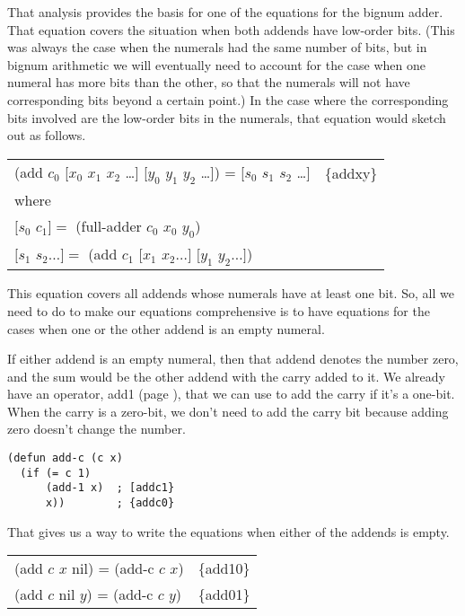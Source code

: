 That analysis provides the basis for
one of the equations for the bignum adder.
That equation covers the situation when both addends have
low-order bits. (This was always the case when
the numerals had the same number of bits, but in bignum
arithmetic we will eventually need to account for the
case when one numeral has more bits than the other,
so that the numerals will not have corresponding bits 
beyond a certain point.)
In the case where the corresponding bits involved
are the low-order bits in the numerals,
that equation would sketch out as follows.

\begin{center}
\begin{tabular}{ll}
(add $c_0$ [$x_0$ $x_1$ $x_2$ \dots ] [$y_0$ $y_1$ $y_2$ \dots ]) = [$s_0$ $s_1$ $s_2$ \dots ]   & \{addxy\} \\
where & \\
$[s_0$ $c_1] =$ (full-adder $c_0$ $x_0$ $y_0$) & \\
$[s_1$ $s_2 \dots ] =$ (add $c_1$ $[x_1$ $x_2 \dots ]$ $[y_1$ $y_2 \dots ]$) & \\
\end{tabular}
\end{center}

This equation covers all addends whose numerals have at least one bit.
So, all we need to do to make our equations comprehensive
is to have equations for the cases when one or the other addend is an empty numeral.

If either addend is an empty numeral, then that addend denotes the number zero,
and the sum would be the other addend with the carry added to it.
We already have an operator, add1 (page \pageref{add-1-defun}), 
that we can use to add the carry if it's a one-bit.
When the carry is a zero-bit, we don't need to add the carry bit
because adding zero doesn't change the number.

\label{add-c-defun}
\begin{Verbatim}
(defun add-c (c x)
  (if (= c 1)
      (add-1 x)  ; [addc1}
      x))        ; {addc0}
\end{Verbatim}

That gives us a way to write the equations when either of the addends is empty.
\begin{center}
\begin{tabular}{ll}
(add $c$ $x$ nil) = (add-c $c$ $x$)   & \{add10\} \\
(add $c$ nil $y$) = (add-c $c$ $y$)   & \{add01\} \\
\end{tabular}
\end{center}


